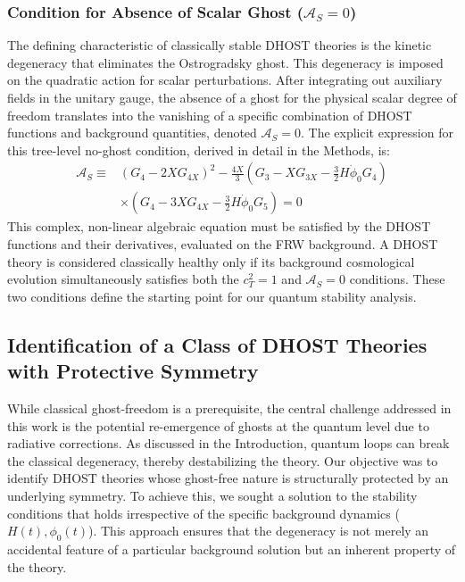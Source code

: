 \documentclass[twocolumn]{aastex631}
\begin{document}
\subsubsection{Condition for Absence of Scalar Ghost ($\mathcal{A}_S=0$)}
The defining characteristic of classically stable DHOST theories is the kinetic degeneracy that eliminates the Ostrogradsky ghost. This degeneracy is imposed on the quadratic action for scalar perturbations. After integrating out auxiliary fields in the unitary gauge, the absence of a ghost for the physical scalar degree of freedom translates into the vanishing of a specific combination of DHOST functions and background quantities, denoted $\mathcal{A}_S=0$. The explicit expression for this tree-level no-ghost condition, derived in detail in the Methods, is:
\begin{align}
\mathcal{A}_S \equiv &(G_4 - 2XG_{4X})^2 - \frac{4X}{3} \left( G_3 - XG_{3X} - \frac{3}{2}H\dot{\phi}_0 G_4 \right) \nonumber \\
&\times \left( G_4 - 3XG_{4X} - \frac{3}{2}H\dot{\phi}_0 G_5 \right) = 0
\end{align}
This complex, non-linear algebraic equation must be satisfied by the DHOST functions and their derivatives, evaluated on the FRW background. A DHOST theory is considered classically healthy only if its background cosmological evolution simultaneously satisfies both the $c_T^2=1$ and $\mathcal{A}_S=0$ conditions. These two conditions define the starting point for our quantum stability analysis.

\subsection{Identification of a Class of DHOST Theories with Protective Symmetry}
While classical ghost-freedom is a prerequisite, the central challenge addressed in this work is the potential re-emergence of ghosts at the quantum level due to radiative corrections. As discussed in the Introduction, quantum loops can break the classical degeneracy, thereby destabilizing the theory. Our objective was to identify DHOST theories whose ghost-free nature is structurally protected by an underlying symmetry. To achieve this, we sought a solution to the stability conditions that holds irrespective of the specific background dynamics ($H(t), \phi_0(t)$). This approach ensures that the degeneracy is not merely an accidental feature of a particular background solution but an inherent property of the theory.
\end{document}
